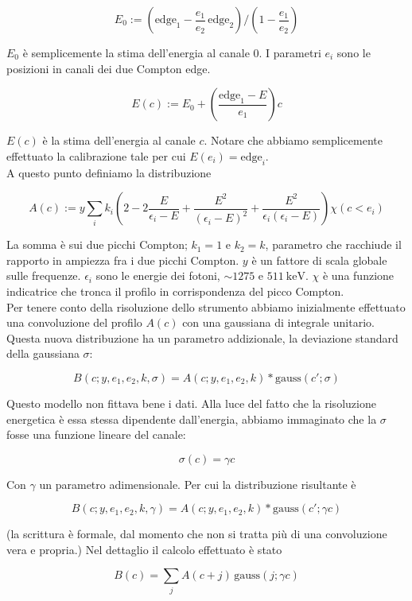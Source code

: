 \documentclass[10pt,a4paper]{article}
\begin{document}
\[E_0 := \left(\text{edge}_1 - \frac{e_1}{e_2} \, \text{edge}_2\right)/\left(1-\frac{e_1}{e_2}\right) \]

$E_0$ è semplicemente la stima dell'energia al canale $0$. I parametri $e_i$ sono le posizioni in canali dei due Compton edge.

\[E(c) := E_0 + \left(\frac{\text{edge}_1 - E}{e_1}\right) c\]

$E(c)$ è la stima dell'energia al canale $c$. Notare che abbiamo semplicemente effettuato la calibrazione tale per cui $E(e_i) = \text{edge}_i$.\\

A questo punto definiamo la distribuzione

\[ A(c) := y \sum_i k_i \left( 2-2 \frac {E} {\epsilon_i - E} + \frac{E^2}{(\epsilon_i-E)^2} + \frac{E^2}{\epsilon_i (\epsilon_i-E)} \right) \chi(c<e_i) \]

La somma è sui due picchi Compton; $k_1 = 1$ e $k_2 = k$, parametro che racchiude il rapporto in ampiezza fra i due picchi Compton. $y$ è un fattore di scala globale sulle frequenze. $\epsilon_i$ sono le energie dei fotoni, $\sim 1275$ e $\SI{511}{\kilo\electronvolt}$. $\chi$ è una funzione indicatrice che tronca il profilo in corrispondenza del picco Compton.\\

Per tenere conto della risoluzione dello strumento abbiamo inizialmente effettuato una convoluzione del profilo $A(c)$ con una gaussiana di integrale unitario. Questa nuova distribuzione ha un parametro addizionale, la deviazione standard della gaussiana $\sigma$:

\[ B(c;y,e_1,e_2,k,\sigma) = A(c;y,e_1,e_2,k) * \text{gauss}(c';\sigma) \]

Questo modello non fittava bene i dati. Alla luce del fatto che la risoluzione energetica è essa stessa dipendente dall'energia, abbiamo immaginato che la $\sigma$ fosse una funzione lineare del canale:

\[ \sigma(c) = \gamma c \]

Con $\gamma$ un parametro adimensionale. Per cui la distribuzione risultante è

\[ B(c; y, e_1, e_2, k ,\gamma) = A(c;y,e_1,e_2,k) * \text{gauss}(c';\gamma c) \]

(la scrittura è formale, dal momento che non si tratta più di una convoluzione vera e propria.) Nel dettaglio il calcolo effettuato è stato

\[ B(c) = \sum_j A(c+j)\,  \text{gauss}(j;\gamma c) \]
\end{document}
